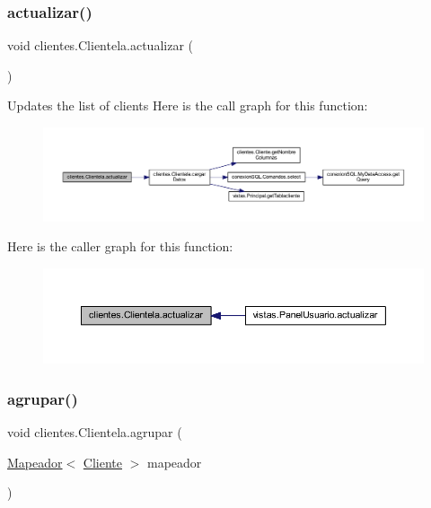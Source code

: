 \subsubsection{\texorpdfstring{actualizar()}{actualizar()}}
{\footnotesize\ttfamily void clientes.\+Clientela.\+actualizar (\begin{DoxyParamCaption}{ }\end{DoxyParamCaption})}

Updates the list of clients Here is the call graph for this function\+:\nopagebreak
\begin{figure}[H]
\begin{center}
\leavevmode
\includegraphics[width=350pt]{classclientes_1_1_clientela_acea670c44be086472e0ccd9c3f2c1f67_cgraph}
\end{center}
\end{figure}
Here is the caller graph for this function\+:\nopagebreak
\begin{figure}[H]
\begin{center}
\leavevmode
\includegraphics[width=350pt]{classclientes_1_1_clientela_acea670c44be086472e0ccd9c3f2c1f67_icgraph}
\end{center}
\end{figure}
\mbox{\label{classclientes_1_1_clientela_ae120fcd5a51e1d17d11e3b36ca1d8290}} 
\subsubsection{\texorpdfstring{agrupar()}{agrupar()}}
{\footnotesize\ttfamily void clientes.\+Clientela.\+agrupar (\begin{DoxyParamCaption}\item[{\mbox{\hyperlink{interfaceclientes_1_1_mapeador}{Mapeador}}$<$ \mbox{\hyperlink{classclientes_1_1_cliente}{Cliente}} $>$}]{mapeador }\end{DoxyParamCaption})}

